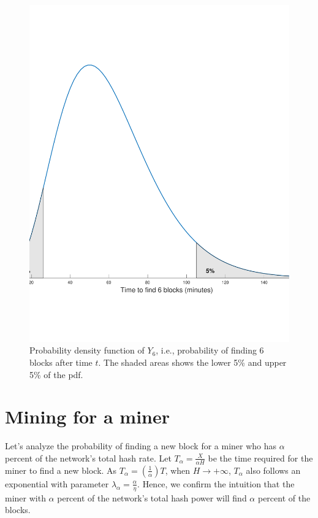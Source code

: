 \begin{figure}[ht]
\centering\includegraphics[width=\textwidth]{./images01/time-6-blocks.pdf}
\caption{Probability density function of $Y_6$, i.e., probability of finding 6 blocks after time $t$. The shaded areas shows the lower 5\% and upper 5\% of the pdf.\label{fig-bitcoin-time-6-blocks}}
\end{figure}

\section{Mining for a miner}

Let's analyze the probability of finding a new block for a miner who has $\alpha$ percent of the network's total hash rate. Let $T_\alpha = \frac{X}{\alpha H}$ be the time required for the miner to find a new block. As $T_\alpha = \left( \frac{1}{\alpha} \right) T$, when $H \rightarrow +\infty$, $T_\alpha$ also follows an exponential with parameter $\lambda_\alpha = \frac{\alpha}{\eta}$. Hence, we confirm the intuition that the miner with $\alpha$ percent of the network's total hash power will find $\alpha$ percent of the blocks.

